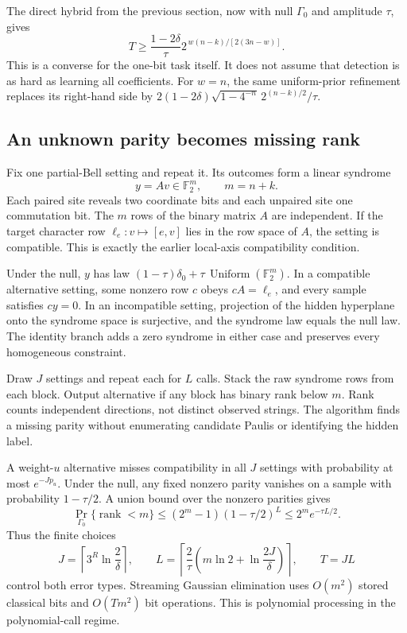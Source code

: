 \documentclass[11pt,a4paper]{article}
\numberwithin{equation}{section}
\theoremstyle{definition}
\theoremstyle{remark}
\begin{document}
The direct hybrid from the previous section, now with null \(\Gamma_0\) and amplitude \(\tau\), gives
\begin{equation}
 T\geq\frac{1-2\delta}{\tau}
 2^{\,w(n-k)/[2(3n-w)]}.
 \label{eq:plmt-det-lower}
\end{equation}
This is a converse for the one-bit task itself. It does not assume that detection is as hard as learning all coefficients.
For \(w=n\), the same uniform-prior refinement replaces its right-hand side by
\(2(1-2\delta)\sqrt{1-4^{-n}}\,2^{(n-k)/2}/\tau\).

\subsection{An unknown parity becomes missing rank}
Fix one partial-Bell setting and repeat it. Its outcomes form a linear syndrome
\[
 y=Av\in\mathbb F_2^m,\qquad m=n+k.
\]
Each paired site reveals two coordinate bits and each unpaired site one commutation bit. The \(m\) rows of the binary matrix \(A\) are independent. If the target character row \(\ell_e:v\mapsto[e,v]\) lies in the row space of \(A\), the setting is compatible. This is exactly the earlier local-axis compatibility condition.

Under the null, \(y\) has law
\((1-\tau)\delta_0+\tau\,\operatorname{Uniform}(\mathbb F_2^m)\).
In a compatible alternative setting, some nonzero row \(c\) obeys
\(cA=\ell_e\), and every sample satisfies \(cy=0\). In an incompatible setting, projection of the hidden hyperplane onto the syndrome space is surjective, and the syndrome law equals the null law. The identity branch adds a zero syndrome in either case and preserves every homogeneous constraint.

Draw \(J\) settings and repeat each for \(L\) calls. Stack the raw syndrome rows from each block. Output alternative if any block has binary rank below \(m\). Rank counts independent directions, not distinct observed strings. The algorithm finds a missing parity without enumerating candidate Paulis or identifying the hidden label.

A weight-\(u\) alternative misses compatibility in all \(J\) settings with probability at most \(e^{-Jp_u}\). Under the null, any fixed nonzero parity vanishes on a sample with probability \(1-\tau/2\). A union bound over the nonzero parities gives
\[
 \Pr_{\Gamma_0}\{\operatorname{rank}<m\}
 \leq(2^m-1)(1-\tau/2)^L
 \leq2^m e^{-\tau L/2}.
\]
Thus the finite choices
\begin{equation}
 J=\left\lceil3^R\ln\frac2\delta\right\rceil,\qquad
 L=\left\lceil\frac2\tau
 \left(m\ln2+\ln\frac{2J}{\delta}\right)\right\rceil,
 \qquad T=JL
 \label{eq:plmt-JL}
\end{equation}
control both error types. Streaming Gaussian elimination uses \(O(m^2)\) stored classical bits and \(O(Tm^2)\) bit operations. This is polynomial processing in the polynomial-call regime.
\end{document}
